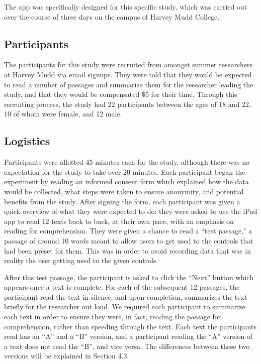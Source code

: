 \documentclass[11pt,letterpaper]{article}
\begin{document}
The app was specifically designed for this specific study, which was carried out over the course of three days on the campus of Harvey Mudd College.

\subsection{Participants}

The participants for this study were recruited from amongst summer researchers at Harvey Mudd via email signups. They were told that they would be expected to read a number of passages and summarize them for the researcher leading the study, and that they would be compensated \$5 for their time. Through this recruiting process, the study had 22 participants between the ages of 18 and 22, 10 of whom were female, and 12 male.

\subsection{Logistics}

Participants were allotted 45 minutes each for the study, although there was no expectation for the study to take over 20 minutes. Each participant began the experiment by reading an informed consent form which explained how the data would be collected, what steps were taken to ensure anonymity, and potential benefits from the study. After signing the form, each participant was given a quick overview of what they were expected to do: they were asked to use the iPad app to read 12 texts back to back, at their own pace, with an emphasis on reading for comprehension. They were given a chance to read a ``test passage," a passage of around 10 words meant to allow users to get used to the controls that had been preset for them. This was in order to avoid recording data that was in reality the user getting used to the given controls.

After this test passage, the participant is asked to click the ``Next'' button which appears once a text is complete. For each of the subsequent 12 passages, the participant read the text in silence, and upon completion, summarizes the text briefly for the researcher out loud. We required each participant to summarize each text in order to ensure they were, in fact, reading the passage for comprehension, rather than speeding through the text. Each text the participants read has an ``A'' and a ``B'' version, and a participant reading the ``A'' version of a text does not read the ``B'', and vice versa. The differences between these two versions will be explained in Section 4.3.
\end{document}
